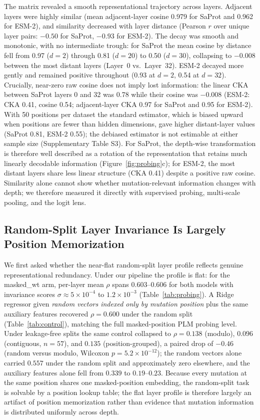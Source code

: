 \documentclass[numbered,webpdf,modern,large]{oup-authoring-template}
\newcommand{\rone}[1]{#1}
\newcommand{\rtwo}[1]{#1}
\newcommand{\rthree}[1]{#1}
\begin{document}
The matrix revealed a smooth representational trajectory across layers. Adjacent layers
were highly similar (\rthree{mean adjacent-layer cosine 0.979 for SaProt and 0.962 for
ESM-2}), and similarity \rtwo{decreased with
layer distance (Pearson $r$ over unique layer pairs: $-0.50$ for SaProt, $-0.93$ for
ESM-2)}. \rone{The decay was smooth and
monotonic, with no intermediate trough: for SaProt the mean cosine by distance fell
from 0.97 ($d=2$) through \rthree{0.81} ($d=20$) to 0.50 ($d=30$), collapsing to \rthree{$-0.008$}
between the most distant layers (Layer~0 vs.\ Layer~32). ESM-2 decayed more gently and
remained positive throughout (0.93 at $d=2$, \rthree{0.54} at $d=32$). Crucially, near-zero raw
cosine does not imply lost information: the linear CKA between SaProt layers 0 and 32
was \rthree{0.78} while their cosine was \rthree{$-0.008$ (ESM-2: CKA 0.41, cosine 0.54; adjacent-layer
CKA 0.97 for SaProt and 0.95 for ESM-2). With 50 positions per dataset the standard
estimator, which is biased upward when positions are fewer than hidden dimensions, gave
higher distant-layer values (SaProt 0.81, ESM-2 0.55); the debiased estimator is not
estimable at either sample size (Supplementary Table S3). For SaProt,} the depth-wise
transformation is therefore
well described as a rotation of the representation that \rtwo{retains much} linearly
decodable information (Figure~\ref{fig:probing}c)\rthree{; for ESM-2, the most distant
layers share less linear structure (CKA 0.41) despite a positive raw cosine}.} \rtwo{Similarity alone cannot show
whether mutation-relevant information changes with depth; we therefore measured it
directly with supervised probing, multi-scale pooling, and the logit lens.}

\subsection{\rone{Random-Split Layer Invariance Is Largely Position Memorization}}

We first asked \rone{whether the near-flat random-split layer profile reflects genuine
representational redundancy. \rtwo{Under our pipeline the profile is flat}: for the
masked\_wt arm, per-layer mean $\rho$ spans
$0.603$--$0.606$ for both models with invariance scores $\sigma \approx 5 \times
10^{-4}$ to $1.2 \times 10^{-3}$ (Table~\ref{tab:probing}). A Ridge regressor given
\emph{random vectors indexed only by mutation position} plus the same auxiliary
features recovered $\rho = 0.600$ under the random split (Table~\ref{tab:control}),
matching the full masked-position PLM probing level. Under leakage-free splits the
same control collapsed to $\rho = 0.138$ (modulo), $0.096$ (contiguous, $n=57$), and
$0.135$ (position-grouped), a paired drop of $-0.46$ (random versus modulo, Wilcoxon
$p = 5.2 \times 10^{-12}$); the random vectors alone carried $0.557$ under the random
split and approximately zero elsewhere, and the auxiliary features alone fell from
$0.339$ to $0.19$--$0.23$. Because every mutation at the same position shares one
masked-position embedding, the random-split task is solvable by a position lookup
table; the flat layer profile is therefore largely an artifact of position
memorization rather than evidence that mutation information is distributed uniformly
across depth.}
\end{document}
